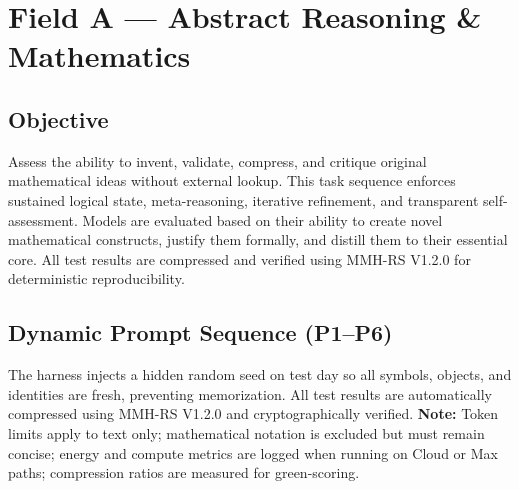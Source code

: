 \section{Field A — Abstract Reasoning \& Mathematics}
\label{sec:fieldA}

\subsection*{Objective}
Assess the ability to invent, validate, compress, and critique original mathematical ideas without external lookup. This task sequence enforces sustained logical state, meta-reasoning, iterative refinement, and transparent self-assessment. Models are evaluated based on their ability to create novel mathematical constructs, justify them formally, and distill them to their essential core. All test results are compressed and verified using MMH-RS V1.2.0 for deterministic reproducibility.

\subsection*{Dynamic Prompt Sequence (P1–P6)}
The harness injects a hidden random seed on test day so all symbols, objects, and identities are fresh, preventing memorization. All test results are automatically compressed using MMH-RS V1.2.0 and cryptographically verified.
\textbf{Note:} Token limits apply to text only; mathematical notation is excluded but must remain concise; energy and compute metrics are logged when running on Cloud or Max paths; compression ratios are measured for green-scoring.

